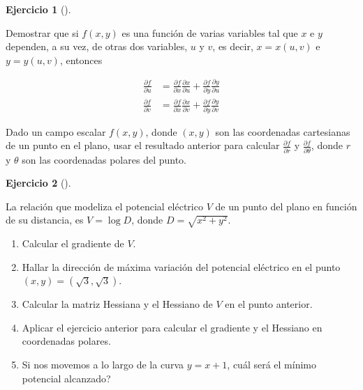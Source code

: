 \documentclass[
  a4paper,
]{scrreport}
\theoremstyle{definition}
\newtheorem{exercise}{Ejercicio}[chapter]
\theoremstyle{remark}
\begin{document}
\begin{exercise}[]\protect\hypertarget{exr-regla-cadena-coordenadas-polares}{}\label{exr-regla-cadena-coordenadas-polares}

Demostrar que si \(f(x,y)\) es una función de varias variables tal que
\(x\) e \(y\) dependen, a su vez, de otras dos variables, \(u\) y \(v\),
es decir, \(x=x(u,v)\) e \(y=y(u,v)\), entonces

\begin{align*}
\frac{\partial f}{\partial u} 
&= \frac{\partial f}{\partial x} \frac{\partial x}{\partial u} + \frac{\partial f}{\partial y} \frac{\partial y}{\partial u} \\
\frac{\partial f}{\partial v} 
&= \frac{\partial f}{\partial x} \frac{\partial x}{\partial v} + \frac{\partial f}{\partial y} \frac{\partial y}{\partial v} 
\end{align*}

Dado un campo escalar \(f(x,y)\), donde \((x,y)\) son las coordenadas
cartesianas de un punto en el plano, usar el resultado anterior para
calcular \(\frac{\partial f}{\partial r}\) y
\(\frac{\partial f}{\partial \theta}\), donde \(r\) y \(\theta\) son las
coordenadas polares del punto.

\end{exercise}

\begin{exercise}[]\protect\hypertarget{exr-potencial-electrico}{}\label{exr-potencial-electrico}

La relación que modeliza el potencial eléctrico \(V\) de un punto del
plano en función de su distancia, es \(V=\log D\), donde
\(D=\sqrt{x^2+y^2}\).

\begin{enumerate}
\def\labelenumi{\alph{enumi}.}
\item
  Calcular el gradiente de \(V\).
\item
  Hallar la dirección de máxima variación del potencial eléctrico en el
  punto \((x,y)=(\sqrt{3},\sqrt{3})\).
\item
  Calcular la matriz Hessiana y el Hessiano de \(V\) en el punto
  anterior.
\item
  Aplicar el ejercicio anterior para calcular el gradiente y el Hessiano
  en coordenadas polares.
\item
  Si nos movemos a lo largo de la curva \(y=x+1\), cuál será el mínimo
  potencial alcanzado?
\end{enumerate}

\end{exercise}
\end{document}
